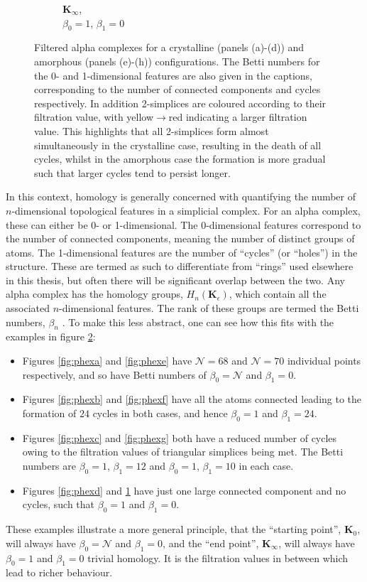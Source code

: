\begin{figure}[tb]
\begin{subfigure}[b]{0.22\textwidth}
         \caption{$\mathbf{K}_\infty$,\\ $\beta_0=1$, $\beta_1=0$}
         \label{fig:phexh}
     \end{subfigure}
   
	\caption{Filtered alpha complexes for a crystalline (panels (a)\--(d)) and amorphous (panels (e)\--(h)) configurations. The Betti numbers for the 0\-- and 1\--dimensional features are also given in the captions, corresponding to the number of connected components and cycles respectively. In addition 2\--simplices are coloured according to their filtration value, with yellow$\rightarrow$red indicating a larger filtration value. This highlights that all 2\--simplices form almost simultaneously in the crystalline case, resulting in the death of all cycles, whilst in the amorphous case the formation is more gradual such that larger cycles tend to persist longer.}
	\label{fig:phex}
\end{figure}

In this context, homology is generally concerned with quantifying the number of $n$\--dimensional topological features in a simplicial complex.
For an alpha complex, these can either be 0\-- or 1\--dimensional.
The 0\--dimensional features correspond to the number of connected components, meaning the number of distinct groups of atoms.
The 1\--dimensional features are the number of ``cycles'' (or ``holes'') in the structure.
These are termed as such to differentiate from ``rings'' used elsewhere in this thesis, but often there will be significant overlap between the two.
Any alpha complex has the homology groups, $H_n\left(\mathbf{K}_\epsilon\right)$, which contain all the associated $n$\--dimensional features.
The rank of these groups are termed the Betti numbers, $\beta_n$ \cite{Zomorodian2005}.
To make this less abstract, one can see how this fits with the examples in figure \ref{fig:phex}:
\begin{itemize}
	\item Figures \ref{fig:phexa} and \ref{fig:phexe} have $\mathcal{N}=68$ and $\mathcal{N}=70$ individual points respectively, and so have Betti numbers of $\beta_0=\mathcal{N}$ and $\beta_1=0$.
	\item Figures \ref{fig:phexb} and \ref{fig:phexf} have all the atoms connected leading to the formation of $24$ cycles in both cases, and hence $\beta_0=1$ and $\beta_1=24$.
	\item Figures \ref{fig:phexc} and \ref{fig:phexg} both have a reduced number of cycles owing to the filtration values of triangular simplices being met. The Betti numbers are $\beta_0=1$, $\beta_1=12$ and $\beta_0=1$, $\beta_1=10$ in each case.
	\item Figures \ref{fig:phexd} and \ref{fig:phexh} have just one large connected component and no cycles, such that $\beta_0=1$ and $\beta_1=0$.
\end{itemize}
These examples illustrate a more general principle, that the ``starting point'', $\mathbf{K}_0$, will always have $\beta_0=\mathcal{N}$ and $\beta_1=0$, and the ``end point'', $\mathbf{K}_\infty$,  will always have $\beta_0=1$ and $\beta_1=0$ \ie{} trivial homology.
It is the filtration values in between which lead to richer behaviour.

